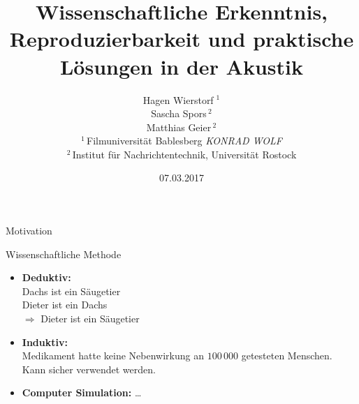 \documentclass{beamer}
\begin{document}
\title{Wissenschaftliche Erkenntnis, Reproduzierbarkeit und praktische Lösungen
in der Akustik}
\subtitle{Hagen Wierstorf$\;^1$\\Sascha Spors$\,^2$\\Matthias Geier$\,^2$\\%
          \vspace{0.5cm}%
          \footnotesize{%
          $^1\,$Filmuniversität Bablesberg \emph{KONRAD WOLF}\\%
          $^2\,$Institut für Nachrichtentechnik, Universität Rostock}}
\date{07.03.2017}
\maketitle

\begin{frame}{Motivation}

\end{frame}

\begin{frame}{Wissenschaftliche Methode}

    \begin{itemize}
        \item \textbf{Deduktiv:} \\
            \small{Dachs ist ein Säugetier\\%
                   Dieter ist ein Dachs\\%
                   $\Rightarrow$ Dieter ist ein Säugetier}
        \item \textbf{Induktiv:} \\
            \small{Medikament hatte keine Nebenwirkung an $100\,000$ getesteten
                   Menschen.\\%
                   Kann sicher verwendet werden.}
        \item \textbf{Computer Simulation:} \dots
    \end{itemize}

\end{frame}
\end{document}
